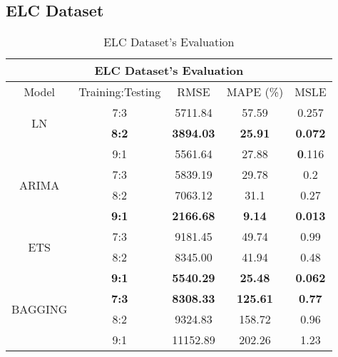 \documentclass{ieeeojies}
\begin{document}
\subsection{ELC Dataset} 
\begin{table}[H]
    \centering
    \begin{tabular}{|c|c|c|c|c|}
         \hline
         \multicolumn{5}{|c|}{\textbf{ELC Dataset's Evaluation}}\\
         \hline
         \centering Model & Training:Testing & RMSE & MAPE (\%) & MSLE\\
         \hline
         \multirow{2}{*}{LN} & 7:3 & 5711.84 & 57.59 &0.257 \\ & \textbf{8:2} & \textbf{3894.03} & \textbf{25.91} & \textbf{0.072} \\ & 9:1 & 5561.64 & 27.88 & \textbf0.116\\
         \hline
         \multirow{2}{*}{ARIMA} & 7:3 &  5839.19&  29.78 & 0.2 \\ & 8:2 &  7063.12 & 31.1 & 0.27 \\ & \textbf{9:1} & \textbf{2166.68}  & \textbf{9.14} & \textbf{0.013}\\
         \hline
         \multirow{2}{*}{ETS} & 7:3 & 9181.45 & 49.74 & 0.99 \\ & 8:2  &   8345.00 &41.94 & 0.48 \\ & \textbf{9:1} &  	\textbf{5540.29} &	\textbf{25.48} & 	\textbf{0.062} \\
         \hline
         \multirow{2}{*}{BAGGING} & \textbf{7:3} & \textbf{8308.33} & \textbf{125.61} & \textbf{0.77} \\ & 8:2  &   9324.83 &158.72 & 0.96 \\ & 9:1 &  	11152.89 & 202.26 & 1.23 \\
         \hline
    \end{tabular}
    \caption{ELC Dataset's Evaluation}
    \label{vcbresult}
\end{table}
\end{document}
